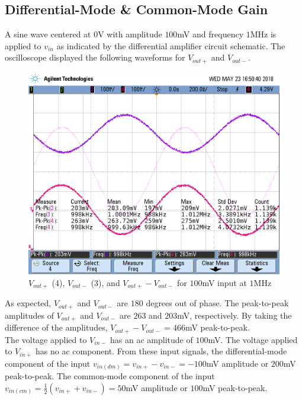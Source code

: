 \subsection{Differential-Mode \& Common-Mode Gain}

A sine wave centered at $0$\si{\volt} with amplitude $100$\si{\milli\volt} and frequency $1$\si{\mega\hertz} is applied to $v_{in}$ as indicated by the differential amplifier circuit schematic. 
The oscilloscope displayed the following waveforms for $V_{out+}$ and $V_{out-}$.

\FloatBarrier

\begin{figure}[h!]
	\centering
	\includegraphics[scale=0.50]{./images/scope_5}
	\caption{$V_{out+}$ (4), $V_{out-}$ (3), and $V_{out+} - V_{out-}$ for $100$\si{\milli\volt} input at $1$\si{\mega\hertz}}
	\label{fig:scope_5}
\end{figure}

\FloatBarrier

As expected, $V_{out+}$ and $V_{out-}$ are $180$ degrees out of phase.
The peak-to-peak amplitudes of $V_{out+}$ and $V_{out-}$ are $263$ and $203$\si{\milli\volt}, respectively.
By taking the difference of the amplitudes, $V_{out+} - V_{out-} = 466$\si{\milli\volt} peak-to-peak. \\

The voltage applied to $V_{in-}$ has an ac amplitude of $100$\si{\milli\volt}.
The voltage applied to $V_{in+}$ has no ac component.
From these input signals, the differential-mode component of the input $v_{in(dm)} = v_{in+} - v_{in-} = -100$\si{\milli\volt} amplitude or $200$\si{\milli\volt} peak-to-peak.
The common-mode component of the input $v_{in(cm)} = \frac{1}{2}(v_{in+} + v_{in-}) = 50$\si{\milli\volt} amplitude or $100$\si{\milli\volt} peak-to-peak. \\

